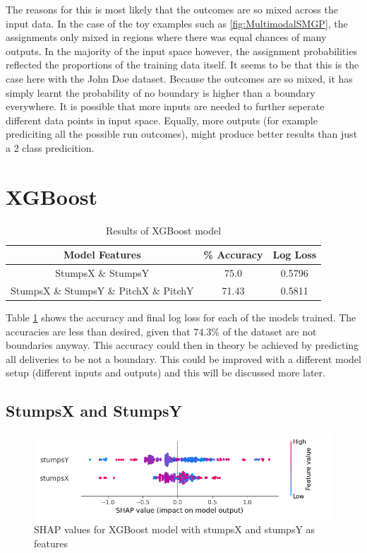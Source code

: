 \documentclass[12pt,a4paper]{report}
\theoremstyle{definition}
\begin{document}
The reasons for this is most likely that the outcomes are so mixed across the input data. 
In the case of the toy examples such as \ref{fig:MultimodalSMGP}, the assignments only mixed in regions where there was equal chances of many outputs. 
In the majority of the input space however, the assignment probabilities reflected the proportions of the training data itself.
It seems to be that this is the case here with the John Doe dataset.
Because the outcomes are so mixed, it has simply learnt the probability of no boundary is higher than a boundary everywhere.
It is possible that more inputs are needed to further seperate different data points in input space.
Equally, more outputs (for example prediciting all the possible run outcomes), might produce better results than just a 2 class predicition.

\section{XGBoost}

\begin{table}[H] \label{tab:XGResults}
	\centering
	\caption{Results of XGBoost model}
	\begin{tabular}{| c | c | c |} 
		\hline
		Model Features & \% Accuracy & Log Loss \\ [0.5ex] 
		\hline\hline
		StumpsX \& StumpsY & 75.0 & 0.5796 \\
		\hline
		StumpsX \& StumpsY \& PitchX \& PitchY & 71.43 & 0.5811 \\ [1ex]
		\hline
	\end{tabular}
\end{table}

Table \ref{tab:XGResults} shows the accuracy and final log loss for each of the models trained. 
The accuracies are less than desired, given that $74.3\%$ of the dataset are not boundaries anyway.
This accuracy could then in theory be achieved by predicting all deliveries to be not a boundary.
This could be improved with a different model setup (different inputs and outputs) and this will be discussed more later.

\subsection{StumpsX and StumpsY}

\begin{figure}[H]
    \centering
    \includegraphics[width=\linewidth]{shap_stumps.png}
    \caption{SHAP values for XGBoost model with stumpsX and stumpsY as features}
    \label{fig:ShapStumps}
\end{figure}
\end{document}
